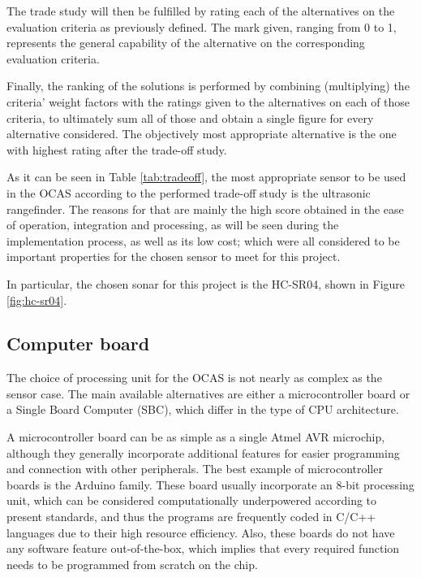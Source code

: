 The trade study will then be fulfilled by rating each of the alternatives on the evaluation criteria as previously defined.
The mark given, ranging from 0 to 1, represents the general capability of the alternative on the corresponding evaluation criteria.

Finally, the ranking of the solutions is performed by combining (multiplying) the criteria' weight factors with the ratings given to the alternatives on each of those criteria, to ultimately sum all of those and obtain a single figure for every alternative considered.
The objectively most appropriate alternative is the one with highest rating after the trade-off study.



As it can be seen in Table \ref{tab:tradeoff}, the most appropriate sensor to be used in the OCAS according to the performed trade-off study is the ultrasonic rangefinder.
The reasons for that are mainly the high score obtained in the ease of operation, integration and processing, as will be seen during the implementation process, as well as its low cost; which were all considered to be important properties for the chosen sensor to meet for this project.

In particular, the chosen sonar for this project is the HC-SR04, shown in Figure \ref{fig:hc-sr04}.



\subsection{Computer board}

The choice of processing unit for the OCAS is not nearly as complex as the sensor case.
The main available alternatives are either a microcontroller board or a Single Board Computer (SBC), which differ in the type of CPU architecture.

A microcontroller board can be as simple as a single Atmel AVR microchip, although they generally incorporate additional features for easier programming and connection with other peripherals.
The best example of microcontroller boards is the Arduino family.
These board usually incorporate an 8-bit processing unit, which can be considered computationally underpowered according to present standards, and thus the programs are frequently coded in C/C++ languages due to their high resource efficiency.
Also, these boards do not have any software feature out-of-the-box, which implies that every required function needs to be programmed from scratch on the chip.

